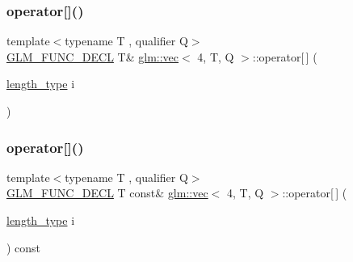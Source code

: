 \mbox{\label{structglm_1_1vec_3_014_00_01_t_00_01_q_01_4_a49fc7a64b8898f20a4f223a41c97eaef}} 
\subsubsection{\texorpdfstring{operator[]()}{operator[]()}\hspace{0.1cm}{\footnotesize\ttfamily [1/2]}}
{\footnotesize\ttfamily template$<$typename T , qualifier Q$>$ \\
\mbox{\hyperlink{setup_8hpp_ab2d052de21a70539923e9bcbf6e83a51}{G\+L\+M\+\_\+\+F\+U\+N\+C\+\_\+\+D\+E\+CL}} T\& \mbox{\hyperlink{structglm_1_1vec}{glm\+::vec}}$<$ 4, T, Q $>$\+::operator\mbox{[}$\,$\mbox{]} (\begin{DoxyParamCaption}\item[{\mbox{\hyperlink{structglm_1_1vec_3_014_00_01_t_00_01_q_01_4_af1c8f56963141951f4a4724b47e072d9}{length\+\_\+type}}}]{i }\end{DoxyParamCaption})}

\mbox{\label{structglm_1_1vec_3_014_00_01_t_00_01_q_01_4_adea890cef20b856644085cc9fb20a2a2}} 
\subsubsection{\texorpdfstring{operator[]()}{operator[]()}\hspace{0.1cm}{\footnotesize\ttfamily [2/2]}}
{\footnotesize\ttfamily template$<$typename T , qualifier Q$>$ \\
\mbox{\hyperlink{setup_8hpp_ab2d052de21a70539923e9bcbf6e83a51}{G\+L\+M\+\_\+\+F\+U\+N\+C\+\_\+\+D\+E\+CL}} T const\& \mbox{\hyperlink{structglm_1_1vec}{glm\+::vec}}$<$ 4, T, Q $>$\+::operator\mbox{[}$\,$\mbox{]} (\begin{DoxyParamCaption}\item[{\mbox{\hyperlink{structglm_1_1vec_3_014_00_01_t_00_01_q_01_4_af1c8f56963141951f4a4724b47e072d9}{length\+\_\+type}}}]{i }\end{DoxyParamCaption}) const}

